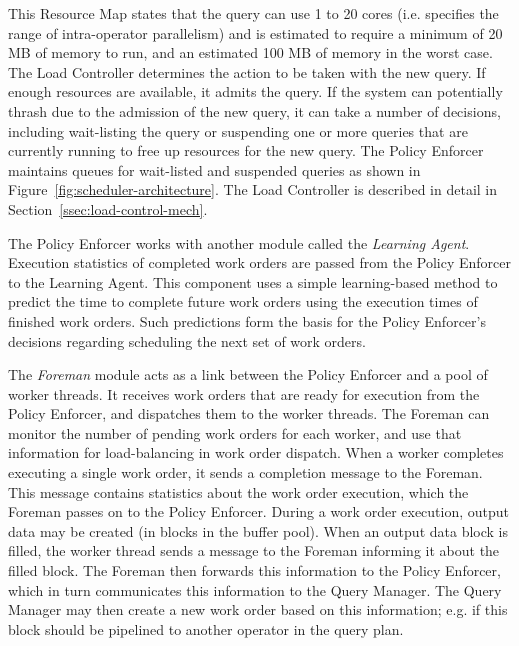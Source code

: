 This Resource Map states that the query can use 1 to 20 cores (i.e. specifies the range of intra-operator parallelism) and is estimated to require a minimum of 20 MB of memory to run, and an estimated 100 MB of memory in the worst case.
The Load Controller determines the action to be taken with the new query. 
If enough resources are available, it admits the query.
If the system can potentially thrash due to the admission of the new query, it
can take a number of decisions, including wait-listing the query or
suspending one or more queries that are currently running to free up resources for the new query.
The Policy Enforcer maintains queues for wait-listed and suspended queries as shown in Figure~\ref{fig:scheduler-architecture}.
The Load Controller is described in detail in Section~\ref{ssec:load-control-mech}.


The Policy Enforcer works with another module called the \textit{Learning Agent}. 
Execution statistics of completed work orders are passed from the Policy Enforcer to the Learning Agent.
This component uses a simple learning-based method to predict the time to 
complete future work orders using the execution times of finished work orders. 
Such predictions form the basis for the Policy Enforcer's decisions regarding scheduling the next set of work orders. 

The \textit{Foreman} module acts as a link between the Policy Enforcer and a pool of worker threads. 
It receives work orders that are ready for execution from the Policy Enforcer, and dispatches them to the worker threads. 
The Foreman can monitor the number of pending work orders for each worker, and 
use that information for load-balancing in work order dispatch.
When a worker completes executing a single work order, it sends a completion message 
to the Foreman.
This message contains statistics about the work order execution, which the Foreman passes on to the Policy Enforcer. 
During a work order execution, output data may be created (in blocks in the buffer pool). 
When an output data block is filled, the worker thread sends a message to the 
Foreman informing it about the filled block. 
The Foreman then forwards this information to the Policy Enforcer, 
which in turn communicates this information to the Query Manager. 
The Query Manager may then create a new work order based on this information;
e.g. if this block should be pipelined to another operator in the query plan.

